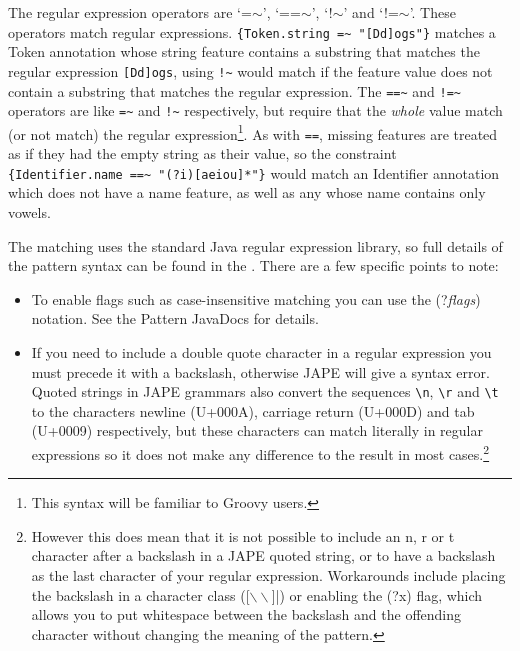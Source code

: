 
The regular expression operators are `=$\sim$', `==$\sim$', `!$\sim$' and
`!=$\sim$'. These operators match regular expressions.  
\verb|{Token.string =~ "[Dd]ogs"}| matches a Token annotation whose string
feature contains a substring that matches the regular expression \verb|[Dd]ogs|, using \verb|!~| would match
if the feature value does not contain a substring that matches the regular
expression.  The \verb|==~| and \verb|!=~| operators are like \verb|=~| and
\verb|!~| respectively, but require that the \emph{whole} value match (or not
match) the regular expression\footnote{This syntax will be familiar to Groovy
users.}.  As with \verb|==|, missing features are treated as if they had the
empty string as their value, so the constraint 
\verb|{Identifier.name ==~ "(?i)[aeiou]*"}| would match an Identifier
annotation which does not have a name feature, as well as any whose name contains only vowels.

The matching uses the standard Java regular expression library, so full details
of the pattern syntax can be found in the
.
There are a few specific points to note:

\begin{itemize}
\item To enable flags such as case-insensitive matching you can use the
      (?\emph{flags}) notation.  See the Pattern JavaDocs for details.
\item If you need to include a double quote character in a regular expression
      you must precede it with a backslash, otherwise JAPE will give a syntax
      error.  Quoted strings in JAPE grammars also convert the sequences
      \verb|\n|, \verb|\r| and \verb|\t| to the characters newline (U+000A),
      carriage return (U+000D) and tab (U+0009) respectively, but these
      characters can match literally in regular expressions so it does not make
      any difference to the result in most cases.\footnote{However this does
      mean that it is not possible to include an n, r or t character after a
      backslash in a JAPE quoted string, or to have a backslash as the last
      character of your regular expression.  Workarounds include placing
      the backslash in a character class ([$\backslash\backslash$]|) or enabling
      the (?x) flag, which allows you to put whitespace between the backslash
      and the offending character without changing the meaning of the pattern.}
\end{itemize}

